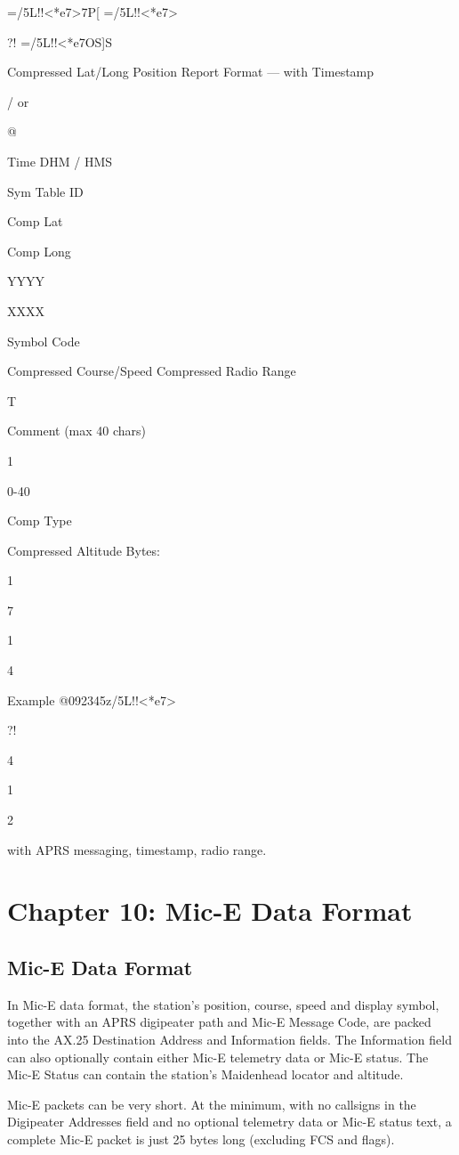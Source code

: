 {{{=/5L!!<*e7>7P[
=/5L!!<*e7>{?!
=/5L!!<*e7OS]S

Compressed Lat/Long Position Report Format — with Timestamp

/ or

@

Time
DHM /
HMS

Sym
Table
ID

Comp
Lat

Comp
Long

YYYY

XXXX

Symbol
Code

Compressed
Course/Speed
Compressed Radio
Range

T

Comment
(max 40
chars)

1

0-40

Comp
Type

Compressed
Altitude
Bytes:

1

7

1

4

Example
@092345z/5L!!<*e7>{?!

4

1

2

with APRS messaging, timestamp, radio range.





\chapter{Chapter 10: Mic-E Data Format}


\section{Mic-E Data Format}

In Mic-E data format, the station’s position, course, speed and display
symbol, together with an APRS digipeater path and Mic-E Message Code,
are packed into the AX.25 Destination Address and Information fields.
The Information field can also optionally contain either Mic-E telemetry data
or Mic-E status. The Mic-E Status can contain the station’s Maidenhead
locator and altitude.

Mic-E packets can be very short. At the minimum, with no callsigns in the
Digipeater Addresses field and no optional telemetry data or Mic-E status
text, a complete Mic-E packet is just 25 bytes long (excluding FCS and
flags).

}}}}}
